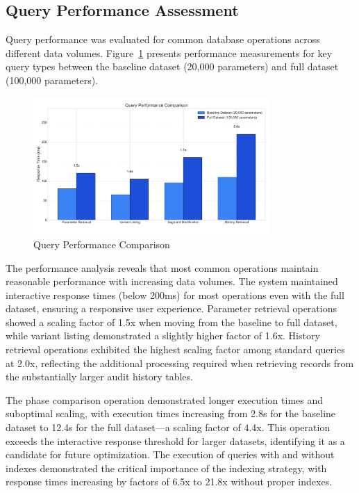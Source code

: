 \subsection{Query Performance Assessment}
\label{subsec:query-performance-assessment}

Query performance was evaluated for common database operations across different data volumes. Figure~\ref{fig:query-performance-comparison} presents performance measurements for key query types between the baseline dataset (20,000 parameters) and full dataset (100,000 parameters).

\begin{figure}[h]
    \centering
    \includegraphics[width=0.8\textwidth]{figures/query_performance_comparison.png}
    \caption{Query Performance Comparison}
    \label{fig:query-performance-comparison}
\end{figure}

The performance analysis reveals that most common operations maintain reasonable performance with increasing data volumes. The system maintained interactive response times (below 200ms) for most operations even with the full dataset, ensuring a responsive user experience. Parameter retrieval operations showed a scaling factor of 1.5x when moving from the baseline to full dataset, while variant listing demonstrated a slightly higher factor of 1.6x. History retrieval operations exhibited the highest scaling factor among standard queries at 2.0x, reflecting the additional processing required when retrieving records from the substantially larger audit history tables.

The phase comparison operation demonstrated longer execution times and suboptimal scaling, with execution times increasing from 2.8s for the baseline dataset to 12.4s for the full dataset—a scaling factor of 4.4x. This operation exceeds the interactive response threshold for larger datasets, identifying it as a candidate for future optimization. The execution of queries with and without indexes demonstrated the critical importance of the indexing strategy, with response times increasing by factors of 6.5x to 21.8x without proper indexes.

